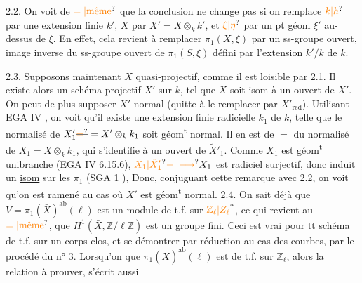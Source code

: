 2.2. On voit de $\unsure{=|\text{même}}$ que la conclusion ne change pas  si on remplace $\unsure{k|h}$ par une extension finie $k'$, $X$ par $X'=X\otimes_k k'$, et $\unsure{\xi|\eta}$ par un pt géom $\xi'$ au-dessus de $\xi$. En effet, cela revient à  remplacer $\pi_1(X,\xi)$ par un ss-groupe ouvert, image inverse du ss-groupe ouvert de $\pi_1(S,\xi)$ défini par l'extension $k'/k$ de $k$.

2.3. Supposons maintenant $X$ quasi-projectif, comme il est loisible par 2.1. Il existe alors un schéma  projectif $X'$ sur $k$,  tel que $X$ soit isom à un ouvert   de $X'$. On peut de plus supposer $X'$ normal (quitte à le remplacer par  $X'_{\mathrm{red}}$).
Utilisant  EGA IV , on voit qu'il  existe une extension finie radicielle $k_1$ de $k$, telle que le normalisé  de $X'_1\deleted{\unsure{=} }=X'\otimes_k k_1$ soit géom\textsuperscript{t} normal.  Il en est de $=$ du normalisé  de $X_1=X\otimes_k k_1$, qui s'identifie à  un ouvert de $\tilde X'_1$. 
Comme $X_1$ est géom\textsuperscript{t} unibranche (EGA IV 6.15.6), $\unsure{\tilde X_1|\tilde X'_1}\unsure{-|\longrightarrow}X_1$ est radiciel surjectif, donc induit un \uline{isom} sur les $\pi_1$ (SGA 1  \unsure{\ldots}),  Donc, conjuguant cette remarque avec 2.2, on voit qu'on est ramené au cas où $X'$ est géom\textsuperscript{t} normal.
2.4. 
On sait déjà que $V=\pi_1(\bar X)^{\mathrm{ab}}(\ell)$ est un module de t.f. sur $\unsure{\mathbb Z_\ell|Z_\ell}$,  ce qui revient au $\unsure{=|\text{même}}$, que $H^1(\bar X,\mathbb Z/\ell\mathbb Z)$ est un groupe fini. \deleted{\unsure{(}} Ceci est vrai pour tt schéma de t.f. sur un corps   clos, et se  démontrer par réduction au cas des courbes, par le procédé du n° 3.
Lorsqu'on   que $\pi_1(\bar X)^{\mathrm{ab}}(\ell)$ est de t.f. sur $\mathbb Z_\ell$, alors la relation à prouver,  s'écrit aussi 
